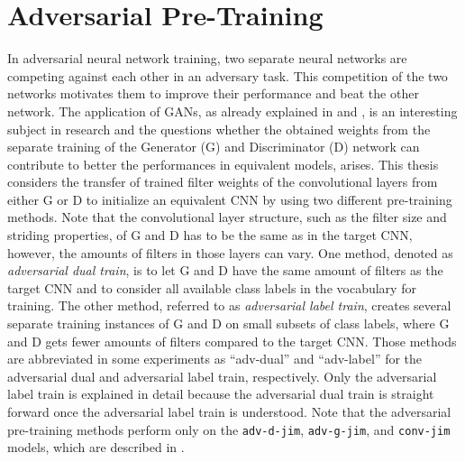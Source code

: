 
\section{Adversarial Pre-Training}\label{sec:nn_adv}
In adversarial neural network training, two separate neural networks are competing against each other in an adversary task.
This competition of the two networks motivates them to improve their performance and beat the other network.
The application of GANs, as already explained in  and , is an interesting subject in research and the questions whether the obtained weights from the separate training of the Generator (G) and Discriminator (D) network can contribute to better the performances in equivalent models, arises.
This thesis considers the transfer of trained filter weights of the convolutional layers from either G or D to initialize an equivalent CNN by using two different pre-training methods.
Note that the convolutional layer structure, such as the filter size and striding properties, of G and D has to be the same as in the target CNN, however, the amounts of filters in those layers can vary.
One method, denoted as \emph{adversarial dual train}, is to let G and D have the same amount of filters as the target CNN and to consider all available class labels in the vocabulary for training.
The other method, referred to as \emph{adversarial label train}, creates several separate training instances of G and D on small subsets of class labels, where G and D gets fewer amounts of filters compared to the target CNN.
Those methods are abbreviated in some experiments as \enquote{adv-dual} and \enquote{adv-label} for the adversarial dual and adversarial label train, respectively.
Only the adversarial label train is explained in detail because the adversarial dual train is straight forward once the adversarial label train is understood.
Note that the adversarial pre-training methods perform only on the \texttt{adv-d-jim}, \texttt{adv-g-jim}, and \texttt{conv-jim} models, which are described in .



